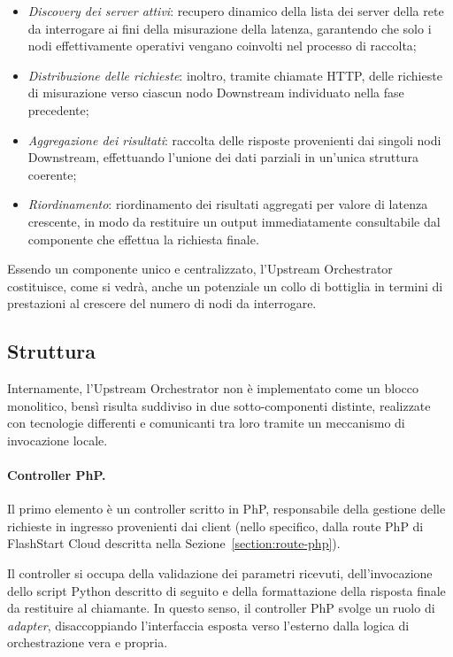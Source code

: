 \begin{itemize}
    \item \emph{Discovery dei server attivi}: recupero dinamico della lista dei server della rete da interrogare ai fini della misurazione della latenza, garantendo che solo i nodi effettivamente operativi vengano coinvolti nel processo di raccolta;
    \item \emph{Distribuzione delle richieste}: inoltro, tramite chiamate \ac{HTTP}, delle richieste di misurazione verso ciascun nodo Downstream individuato nella fase precedente;
    \item \emph{Aggregazione dei risultati}: raccolta delle risposte provenienti dai singoli nodi Downstream, effettuando l'unione dei dati parziali in un'unica struttura coerente;
    \item \emph{Riordinamento}: riordinamento dei risultati aggregati per valore di latenza crescente, in modo da restituire un output immediatamente consultabile dal componente che effettua la richiesta finale.
\end{itemize}

Essendo un componente unico e centralizzato, l'Upstream Orchestrator costituisce, come si vedrà, anche un potenziale un collo di bottiglia in termini di prestazioni al crescere del numero di nodi da interrogare.

\subsection{Struttura}
Internamente, l'Upstream Orchestrator non è implementato come un blocco monolitico, bensì risulta suddiviso in due sotto-componenti distinte, realizzate con tecnologie differenti e comunicanti tra loro tramite un meccanismo di invocazione locale.

\paragraph{Controller PhP.} Il primo elemento è un controller scritto in PhP, responsabile della gestione delle richieste in ingresso provenienti dai client (nello specifico, dalla route PhP di FlashStart Cloud descritta nella Sezione~\ref{section:route-php}).

Il controller si occupa della validazione dei parametri ricevuti, dell'invocazione dello script Python descritto di seguito e della formattazione della risposta finale da restituire al chiamante.
In questo senso, il controller PhP svolge un ruolo di \emph{adapter}, disaccoppiando l'interfaccia esposta verso l'esterno dalla logica di orchestrazione vera e propria.

